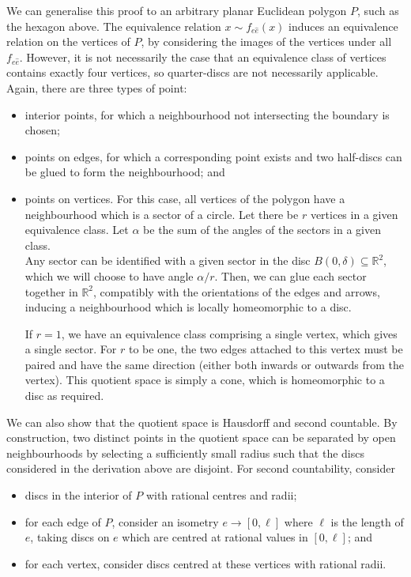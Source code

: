 \begin{example}
	We can generalise this proof to an arbitrary planar Euclidean polygon $P$, such as the hexagon above.
	The equivalence relation $x \sim f_{e \hat e}(x)$ induces an equivalence relation on the vertices of $P$, by considering the images of the vertices under all $f_{e\hat e}$.
	However, it is not necessarily the case that an equivalence class of vertices contains exactly four vertices, so quarter-discs are not necessarily applicable.
	Again, there are three types of point:
	\begin{itemize}
		\item interior points, for which a neighbourhood not intersecting the boundary is chosen;
		\item points on edges, for which a corresponding point exists and two half-discs can be glued to form the neighbourhood; and
		\item points on vertices.
		      For this case, all vertices of the polygon have a neighbourhood which is a sector of a circle.
		      Let there be $r$ vertices in a given equivalence class.
		      Let $\alpha$ be the sum of the angles of the sectors in a given class. \\
		      Any sector can be identified with a given sector in the disc $B(0,\delta) \subseteq \mathbb R^2$, which we will choose to have angle $\alpha / r$.
		      Then, we can glue each sector together in $\mathbb R^2$, compatibly with the orientations of the edges and arrows, inducing a neighbourhood which is locally homeomorphic to a disc.

		      If $r = 1$, we have an equivalence class comprising a single vertex, which gives a single sector.
		      For $r$ to be one, the two edges attached to this vertex must be paired and have the same direction (either both inwards or outwards from the vertex).
		      This quotient space is simply a cone, which is homeomorphic to a disc as required.
	\end{itemize}
	We can also show that the quotient space is Hausdorff and second countable.
	By construction, two distinct points in the quotient space can be separated by open neighbourhoods by selecting a sufficiently small radius such that the discs considered in the derivation above are disjoint.
	For second countability, consider
	\begin{itemize}
		\item discs in the interior of $P$ with rational centres and radii;
		\item for each edge of $P$, consider an isometry $e \to [0, \ell]$ where $\ell$ is the length of $e$, taking discs on $e$ which are centred at rational values in $[0,\ell]$; and
		\item for each vertex, consider discs centred at these vertices with rational radii.
	\end{itemize}
\end{example}


